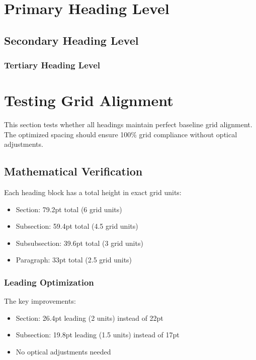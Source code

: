 \documentclass[11pt,a4paper]{article}
\begin{document}
\section{Primary Heading Level}
\lipsum[1][1-3]

\subsection{Secondary Heading Level}
\lipsum[2][1-3]

\subsubsection{Tertiary Heading Level}
\lipsum[3][1-3]

\lipsum[4][1-3]

\section{Testing Grid Alignment}
This section tests whether all headings maintain perfect baseline grid alignment.
The optimized spacing should ensure 100\% grid compliance without optical adjustments.

\subsection{Mathematical Verification}
Each heading block has a total height in exact grid units:
\begin{itemize}
\item Section: 79.2pt total (6 grid units)
\item Subsection: 59.4pt total (4.5 grid units)
\item Subsubsection: 39.6pt total (3 grid units)
\item Paragraph: 33pt total (2.5 grid units)
\end{itemize}

\subsubsection{Leading Optimization}
The key improvements:
\begin{itemize}
\item Section: 26.4pt leading (2 units) instead of 22pt
\item Subsection: 19.8pt leading (1.5 units) instead of 17pt
\item No optical adjustments needed
\end{itemize}
\end{document}

